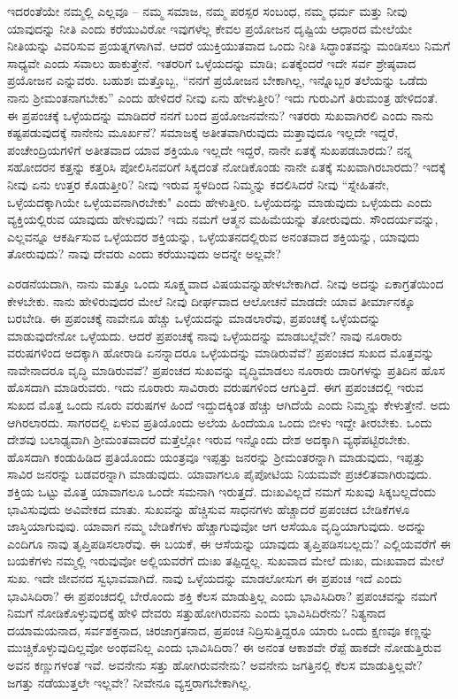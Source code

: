 ಇದರಂತೆಯೇ ನಮ್ಮಲ್ಲಿ ಎಲ್ಲವೂ – ನಮ್ಮ ಸಮಾಜ, ನಮ್ಮ ಪರಸ್ಪರ ಸಂಬಂಧ, ನಮ್ಮ ಧರ್ಮ ಮತ್ತು ನೀವು ಯಾವುದನ್ನು ನೀತಿ ಎಂದು ಕರೆಯುವಿರೋ ಇವುಗಳೆಲ್ಲ ಕೇವಲ ಪ್ರಯೋಜನ ದೃಷ್ಟಿಯ ಆಧಾರದ ಮೇಲೆಯೇ ನೀತಿಯನ್ನು ವಿವರಿಸುವ ಪ್ರಯತ್ನಗಳಾಗಿವೆ. ಆದರೆ ಯುಕ್ತಿಯುತವಾದ ಒಂದು ನೀತಿ ಸಿದ್ಧಾಂತವನ್ನು ಮಂಡಿಸಲು ನಿಮಗೆ ಸಾಧ್ಯವೇ ಎಂದು ಸವಾಲು ಹಾಕುತ್ತೇನೆ. ಇತರರಿಗೆ ಒಳ್ಳೆಯದನ್ನು ಮಾಡಿ; ಏತಕ್ಕೆಂದರೆ ಇದೇ ಸರ್ವ ಶ್ರೇಷ್ಠವಾದ ಪ್ರಯೋಜನ ಎನ್ನುವರು. ಬಹುಶಃ ಮತ್ತೊಬ್ಬ, “ನನಗೆ ಪ್ರಯೋಜನ ಬೇಕಾಗಿಲ್ಲ, ಇನ್ನೊಬ್ಬರ ತಲೆಯನ್ನು ಒಡೆದು ನಾನು ಶ‍್ರೀಮಂತ\-ನಾಗಬೇಕು'' ಎಂದು ಹೇಳಿದರೆ ನೀವು ಏನು ಹೇಳುತ್ತೀರಿ? ಇದು ಗುರುವಿಗೆ ತಿರುಮಂತ್ರ ಹೇಳಿದಂತೆ. ಈ ಪ್ರಪಂಚಕ್ಕೆ ಒಳ್ಳೆಯದನ್ನು ಮಾಡಿದರೆ ನನಗೆ ಬಂದ ಪ್ರಯೋಜನವೇನು? ಇತರರು ಸುಖವಾಗಿರಲಿ ಎಂದು ನಾನು ಕಷ್ಟಪಡುವುದಕ್ಕೆ ನಾನೇನು ಮೂರ್ಖನೆ? ಸಮಾಜಕ್ಕೆ ಅತೀತವಾಗಿರುವುದು ಮತ್ತಾವುದೂ ಇಲ್ಲದೇ ಇದ್ದರೆ, ಪಂಚೇಂದ್ರಿಯಗಳಿಗೆ ಅತೀತವಾದ ಯಾವ ಶಕ್ತಿಯೂ ಇಲ್ಲದೇ ಇದ್ದರೆ, ನಾನೇ ಏತಕ್ಕೆ ಸುಖಪಡಬಾರದು? ನನ್ನ ಸಹೋದರನ ಕತ್ತನ್ನು ಕತ್ತರಿಸಿ ಪೋಲಿಸಿನವರಿಗೆ ಸಿಕ್ಕದಂತೆ ನೋಡಿಕೊಂಡು ನಾನೇ ಏತಕ್ಕೆ ಸುಖವಾಗಿರಬಾರದು? ಇದಕ್ಕೆ ನೀವು ಏನು ಉತ್ತರ ಕೊಡುತ್ತೀರಿ? ನೀವು ಇರುವ ಸ್ಥಳದಿಂದ ನಿಮ್ಮನ್ನು ಕದಲಿಸಿದರೆ ನೀವು “ಸ್ನೇಹಿತನೇ, ಒಳ್ಳೆಯದಕ್ಕಾಗಿಯೇ ಒಳ್ಳೆಯವನಾಗಿರಬೇಕು" ಎಂದು ಹೇಳುತ್ತೀರಿ. ಒಳ್ಳೆಯದನ್ನು ಮಾಡುವುದು ಒಳ್ಳೆಯದು ಎಂದು ವ್ಯಕ್ತಿಯಲ್ಲಿರುವ ಯಾವುದು ಹೇಳುವುದು? ಇದು ನಮಗೆ ಆತ್ಮನ ಮಹಿಮೆಯನ್ನು ತೋರುವುದು. ಸೌಂದರ್ಯವನ್ನು, ಎಲ್ಲವನ್ನೂ ಆಕರ್ಷಿಸುವ ಒಳ್ಳೆಯದರ ಶಕ್ತಿಯನ್ನು, ಒಳ್ಳೆಯತನದಲ್ಲಿರುವ ಅನಂತವಾದ ಶಕ್ತಿಯನ್ನು, ಯಾವುದು ತೋರುವುದು? ನಾವು ದೇವರು ಎಂದು ಕರೆಯುವುದು ಅದನ್ನೇ ಅಲ್ಲವೇ?

ಎರಡನೆಯದಾಗಿ, ನಾನು ಮತ್ತೂ ಒಂದು ಸೂಕ್ಷ್ಮವಾದ ವಿಷಯವನ್ನು\break ಹೇಳಬೇಕಾಗಿದೆ. ನೀವು ಅದನ್ನು ಏಕಾಗ್ರತೆಯಿಂದ ಕೇಳಬೇಕು. ನಾನು ಹೇಳಿರುವುದರ ಮೇಲೆ ನೀವು ದೀರ್ಘವಾದ ಆಲೋಚನೆ ಮಾಡದೇ ಯಾವ ತೀರ್ಮಾನಕ್ಕೂ ಬರಬೇಡಿ. ಈ ಪ್ರಪಂಚಕ್ಕೆ ನಾವೇನೂ ಹೆಚ್ಚು ಒಳ್ಳೆಯದನ್ನು ಮಾಡಲಾರೆವು, ಪ್ರಪಂಚಕ್ಕೆ ಒಳ್ಳೆಯದನ್ನು ಮಾಡುವುದೇನೋ ಒಳ್ಳೆಯದು. ಆದರೆ ಪ್ರಪಂಚಕ್ಕೆ ನಾವು ಒಳ್ಳೆಯದನ್ನು ಮಾಡಬಲ್ಲೆವೇ? ನಾವು ನೂರಾರು ವರುಷಗಳಿಂದ ಅದಕ್ಕಾಗಿ ಹೋರಾಡಿ ಏನನ್ನಾದರೂ ಒಳ್ಳೆಯದನ್ನು ಮಾಡಿರುವೆವೆ? ಪ್ರಪಂಚದ ಸುಖದ ಮೊತ್ತವನ್ನು ನಾವೇನಾದರೂ ವೃದ್ಧಿ ಮಾಡಿರುವವೆ? ಪ್ರಪಂಚದ ಸುಖವನ್ನು ವೃದ್ಧಿಮಾಡಲು ನೂರಾರು ದಾರಿಗಳನ್ನು ಪ್ರತಿದಿನ ಹೊಸ ಹೊಸದಾಗಿ ಮಾಡಿರುವರು. ಇದು ನೂರಾರು ಸಾವಿರಾರು ವರುಷಗಳಿಂದ ಆಗುತ್ತಿದೆ. ಈಗ ಪ್ರಪಂಚದಲ್ಲಿ ಇರುವ ಸುಖದ ಮೊತ್ತ ಒಂದು ನೂರು ವರುಷಗಳ ಹಿಂದೆ ಇದ್ದುದಕ್ಕಿಂತ ಹೆಚ್ಚು ಆಗಿದೆಯೆ ಎಂದು ನಿಮ್ಮನ್ನು ಕೇಳುತ್ತೇನೆ. ಅದು ಆಗಿರಲಾರದು. ಸಾಗರದಲ್ಲಿ ಏಳುವ ಪ್ರತಿಯೊಂದು ಅಲೆಯ ಹಿಂದೆಯೂ ಒಂದು ಬೀಳು ಇದ್ದೇ ತೀರಬೇಕು. ಒಂದು ದೇಶವು ಬಲಾಢ್ಯವಾಗಿ ಶ‍್ರೀಮಂತವಾದರೆ ಮತ್ತೆಲ್ಲೋ ಇರುವ ಇನ್ನೊಂದು ದೇಶ ಅದಕ್ಕಾಗಿ ವ್ಯಥೆಪಟ್ಟಿರಬೇಕು. ಹೊಸದಾಗಿ ಕಂಡುಹಿಡಿದ ಪ್ರತಿಯೊಂದು ಯಂತ್ರವೂ ಇಪ್ಪತ್ತು ಜನರನ್ನು ಶ‍್ರೀಮಂತರನ್ನಾಗಿ ಮಾಡುವುದು, ಇಪ್ಪತ್ತು ಸಾವಿರ ಜನರನ್ನು ಬಡವರನ್ನಾಗಿ ಮಾಡುವುದು. ಯಾವಾಗಲೂ ಪೈಪೋಟಿಯ ನಿಯಮವೇ ಪ್ರಚಲಿತವಾಗಿರುವುದು. ಶಕ್ತಿಯ ಒಟ್ಟು ಮೊತ್ತ ಯಾವಾಗಲೂ ಒಂದೇ ಸಮನಾಗಿ ಇರುತ್ತದೆ. ದುಃಖವಿಲ್ಲದೆ ನಮಗೆ ಸುಖವು ಸಿಕ್ಕಬಲ್ಲದೆಂದು ಭಾವಿಸುವುದು ಅವಿವೇಕದ ಮಾತು. ಸುಖವನ್ನು ಹೆಚ್ಚಿಸುವ ಸಾಧನಗಳು ಹೆಚ್ಚಾದರೆ ಪ್ರಪಂಚದ ಬೇಡಿಕೆಗಳೂ ಜಾಸ್ತಿಯಾಗುವುವು. ಯಾವಾಗ ನಮ್ಮ ಬೇಡಿಕೆಗಳು ಹೆಚ್ಚಾಗುವುವೋ ಆಗ ಆಸೆಯೂ ವೃದ್ಧಿಯಾಗುವುದು. ಅದನ್ನು ಎಂದಿಗೂ ನಾವು ತೃಪ್ತಿಪಡಿಸಲಾರೆವು. ಈ ಬಯಕೆ, ಈ ಆಸೆಯನ್ನು ಯಾವುದು ತೃಪ್ತಿಪಡಿಸಬಲ್ಲದು? ಎಲ್ಲಿಯವರೆಗೆ ಈ ಬಯಕೆಗಳು ನಮ್ಮಲ್ಲಿ ಇರುವುವೋ ಅಲ್ಲಿಯವರೆಗೆ ದುಃಖ ತಪ್ಪಿದ್ದಲ್ಲ. ಸುಖವಾದ ಮೇಲೆ ದುಃಖ, ದುಃಖವಾದ ಮೇಲೆ ಸುಖ. ಇದೇ ಜೀವನದ ಸ್ವಭಾವವಾಗಿದೆ. ನಾವು ಒಳ್ಳೆಯದನ್ನು ಮಾಡಲೋಸುಗ ಈ ಪ್ರಪಂಚ ಇದೆ ಎಂದು ಭಾವಿಸಿದಿರಾ? ಈ ಪ್ರಪಂಚದಲ್ಲಿ ಬೇರೊಂದು ಶಕ್ತಿ ಕೆಲಸ ಮಾಡುತ್ತಿಲ್ಲ ಎಂದು ಭಾವಿಸಿದಿರಾ? ಪ್ರಪಂಚವನ್ನು ನಮಗೆ ನಿಮಗೆ ನೋಡಿಕೊಳ್ಳುವುದಕ್ಕೆ ಹೇಳಿ ದೇವರು ಸತ್ತುಹೋಗಿರುವನು ಎಂದು ಭಾವಿಸಿದಿರೇನು? ನಿತ್ಯನಾದ ದಯಾಮಯನಾದ, ಸರ್ವಶಕ್ತನಾದ, ಚಿರಜಾಗ್ರತನಾದ, ಪ್ರಪಂಚ ನಿದ್ರಿಸುತ್ತಿದ್ದರೂ ಯಾರು ಒಂದು ಕ್ಷಣವೂ ಕಣ್ಣನ್ನು ಮುಚ್ಚಿಕೊಳ್ಳುವುದಿಲ್ಲವೋ ಅಂಥವನಿಲ್ಲ ಎಂದು ಭಾವಿಸಿದಿರಾ? ಈ ಅನಂತ ಆಕಾಶವೇ ರೆಪ್ಪೆ ಹಾಕದೇ ನೋಡುತ್ತಿರುವ ಅವನ ಕಣ್ಣುಗಳಂತೆ ಇವೆ. ಅವನೇನು ಸತ್ತು ಹೋಗಿರುವನೇನು? ಅವನೇನು ಜಗತ್ತಿನಲ್ಲಿ ಕೆಲಸ ಮಾಡುತ್ತಿಲ್ಲವೇ? ಜಗತ್ತು ನಡೆಯುತ್ತಲೇ ಇಲ್ಲವೇ? ನೀವೇನೂ ವ್ಯಸ್ತರಾಗಬೇಕಾಗಿಲ್ಲ.

